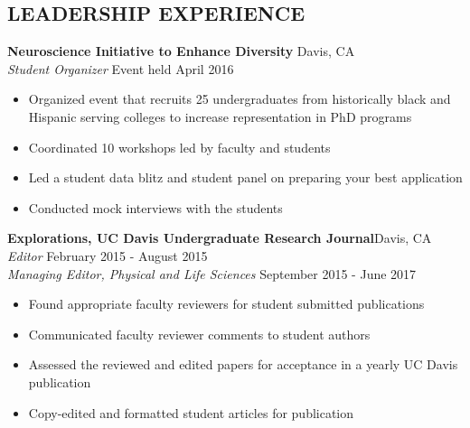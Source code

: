 \documentclass[line,margin,10pt]{res}
\begin{document}
\begin{resume}

 \section{LEADERSHIP EXPERIENCE}
 
 \textbf{Neuroscience Initiative to Enhance Diversity} \hfill
Davis, CA\\
{\sl Student Organizer} \hfill Event held April 2016
\begin{itemize}\itemsep -2pt
\item Organized event that recruits 25 undergraduates from historically black and Hispanic serving colleges to increase representation in PhD programs
\item Coordinated 10 workshops led by faculty and students
\item Led a student data blitz and student panel on preparing your best application
\item Conducted mock interviews with the students
\end{itemize}

\textbf{Explorations, UC Davis Undergraduate Research Journal}\hfill Davis, CA\\{\sl Editor} \hfill February 2015 - August 2015\\
{\sl Managing Editor, Physical and Life Sciences} \hfill September 2015 - June 2017
\begin{itemize}\itemsep -2pt
\item Found appropriate faculty reviewers for student submitted publications
\item Communicated faculty reviewer comments to student authors
\item Assessed the reviewed and edited papers for acceptance in a yearly UC Davis publication
\item Copy-edited and formatted student articles for publication
\end{itemize}


\end{resume}
\end{document}
